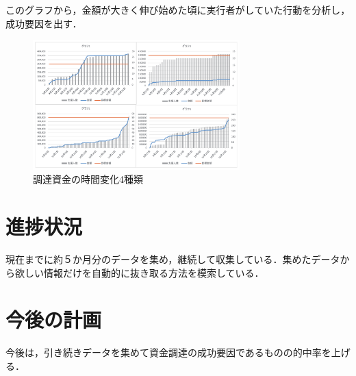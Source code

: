 \documentclass[uplatex,twocolumn,dvipdfmx]{jsarticle}
\begin{document}
このグラフから，金額が大きく伸び始めた頃に実行者がしていた行動を分析し，成功要因を出す．

\begin{figure}[h]
\centering
\includegraphics[width=8cm,clip]{images.pdf}
\caption{調達資金の時間変化4種類}\label{サンプル図}
\end{figure}
\section{進捗状況}
現在までに約５か月分のデータを集め，継続して収集している．集めたデータから欲しい情報だけを自動的に抜き取る方法を模索している．
\section{今後の計画}
今後は，引き続きデータを集めて資金調達の成功要因であるものの的中率を上げる．



\end{document}
